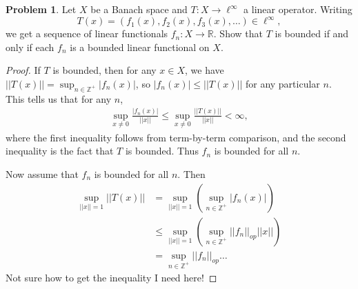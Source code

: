 \documentclass[12pt]{article}
\theoremstyle{definition}
\newtheorem{ex}{Problem}
\begin{document}
\begin{ex}
	Let $X$ be a Banach space and $T : X \to \ell^\infty$ a linear operator.
	Writing \begin{equation*}
		T(x) = (f_1(x), f_2(x), f_3(x), \dots) \in \ell^\infty,
	\end{equation*}
	we get a sequence of linear functionals $f_n : X \to \mathbb{R}$.
	Show that $T$ is bounded if and only if each $f_n$ is a bounded linear functional on $X$.
\end{ex}
\begin{proof}
	If $T$ is bounded, then for any $x \in X$, we have $||T(x)|| = \sup_{n \in \mathbb{Z}^+} |f_n(x)|$, so $|f_n(x)| \leq ||T(x)||$ for any particular $n$.
	This tells us that for any $n$, \begin{align*}
		\sup_{x \neq 0} \frac{|f_n(x)|}{||x||} \leq \sup_{x \neq 0} \frac{||T(x)||}{||x||} < \infty,
	\end{align*}
	where the first inequality follows from term-by-term comparison, and the second inequality is the fact that $T$ is bounded.
	Thus $f_n$ is bounded for all $n$.

	Now assume that $f_n$ is bounded for all $n$.
	Then \begin{align*}
		\sup_{||x||=1}||T(x)|| & = \sup_{||x||=1}\left(\sup_{n \in \mathbb{Z}^+}|f_n(x)| \right)             \\
		                       & \leq \sup_{||x||=1}\left(\sup_{n \in \mathbb{Z}^+}||f_n||_{op}||x|| \right) \\
		                       & = \sup_{n \in \mathbb{Z}^+}||f_n||_{op}\dots
	\end{align*}
	Not sure how to get the inequality I need here!
\end{proof}
\end{document}
